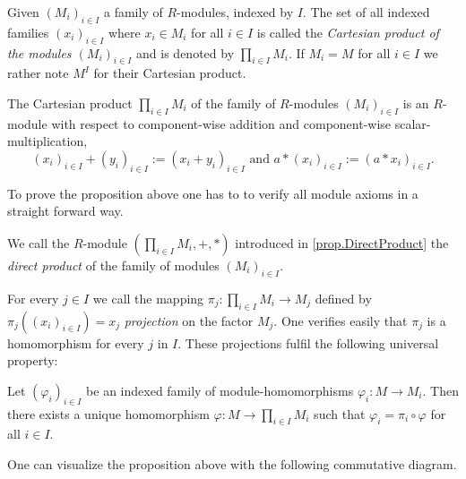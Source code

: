 Given $(M_i)_{i\in I}$ a family of $R$-modules, indexed by $I$. The set of all indexed families $(x_i)_{i\in I}$ where $x_i\in M_i$ for all $i\in I$ is called the \emph{Cartesian product of the modules $(M_i)_{i\in I}$} and is denoted by $\prod\limits_{i\in I} M_i$. If $M_i=M$ for all $i\in I$ we rather note $M^I$ for their Cartesian product.

\begin{pro}\label{prop.DirectProduct}
The Cartesian product $\prod_{i\in I} M_i$ of the family of $R$-modules $(M_i)_{i\in I}$ is an $R$-module with respect to component-wise addition and component-wise scalar-multiplication, \ie{} 
\[(x_i)_{i\in I}+(y_i)_{i\in I}:=(x_i+y_i)_{i\in I}\text{ and }a\ast(x_i)_{i\in I}:=(a\ast x_i)_{i\in I}.\]
\end{pro}

To prove the proposition above one has to to verify all module axioms in a straight forward way.

\begin{defin}\sloppypar
We call the $R$-module $\left(\prod_{i\in I} M_i,+,\ast\right)$ introduced in \cref{prop.DirectProduct} the \emph{direct product} of the family of modules $(M_i)_{i\in I}$.
\end{defin}

For every $j\in I$ we call the mapping $\pi_j\colon \prod_{i\in I} M_i\to M_j$ defined by $\pi_j((x_i)_{i\in I})=x_j$ \emph{projection} on the factor $M_j$. One verifies easily that $\pi_j$ is a homomorphism for every $j$ in $I$. These projections fulfil the following universal property:

\begin{pro}
Let $(\varphi_i)_{i\in I}$ be an indexed family of module-homomorphisms $\varphi_i\colon M\to M_i$. Then there exists a unique homomorphism $\varphi\colon M\to \prod_{i\in I} M_i$ such that $\varphi_i=\pi_i\circ\varphi$ for all $i\in I$.
\end{pro}

One can visualize the proposition above with the following commutative diagram.

\begin{center}
\end{center}

